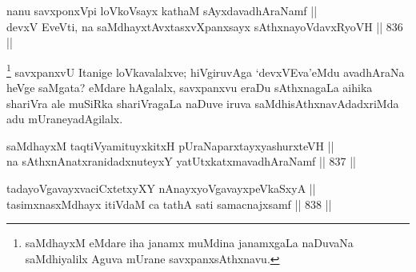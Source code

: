 
\begin{shl}
nanu savxponxV\s pi loVkoV\s sayx kathaM sAyxdavadhAraNamf || \\
devxV EveVti, na saMdhayxtAvxtasxvXpanxsayx sAthxnayoVdavxRyoVH ||  836 ||  
\end{shl}

\begin{artha}
\footnote{saMdhayxM eMdare iha janamx muMdina janamxgaLa naDuvaNa saMdhiyalilx Aguva mUrane savxpanxsAthxnavu.}
savxpanxvU Itanige loVkavalalxve; hiVgiruvAga `devxVEva'eMdu avadhAraNa heVge saMgata? eMdare hAgalalx, savxpanxvu eraDu sAthxnagaLa aihika shariVra ale muSiRka shariVragaLa naDuve iruva saMdhisAthxnavAdadxriMda adu mUraneyadAgilalx. 
\end{artha}


\begin{shl}
saMdhayxM taqtiVyamituyxkitxH pUraNaparxtayxyashurxteVH || \\
na sAthxnAnatxranidadxnuteyxY yatUtxkatxmavadhAraNamf ||  837 ||  
\end{shl}

\begin{shl}
tadayoVgavayxvaciCxtetxyXY nAnayxyoVgavayxpeVkaSxyA || \\
tasimxnasxMdhayx itiVdaM ca tathA sati samacnajxsamf ||  838 ||  
\end{shl}

